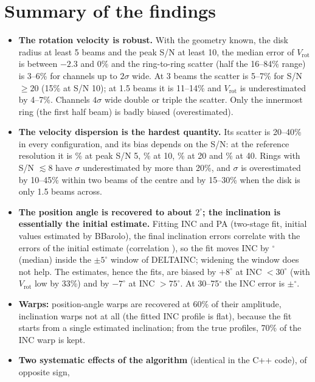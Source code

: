 \documentclass[10pt,a4paper]{article}
\newcommand{\vrot}{V_\mathrm{rot}}
\begin{document}
\section*{Summary of the findings}
\begin{itemize}
\item \textbf{The rotation velocity is robust.} With the geometry known, the disk radius at least 5
  beams and the peak S/N at least 10, the median error of $\vrot$ is between $-2.3$ and $0$\% and the
  ring-to-ring scatter (half the 16--84\% range) is 3--6\% for channels up to $2\sigma$ wide. At 3 beams
  the scatter is 5--7\% for S/N $\geq 20$ (15\% at S/N 10); at 1.5 beams it is 11--14\% and $\vrot$ is
  underestimated by 4--7\%. Channels $4\sigma$ wide double or triple the scatter. Only the innermost ring
  (the first half beam) is badly biased (overestimated).
\item \textbf{The velocity dispersion is the hardest quantity.} Its scatter is 20--40\% in every
  configuration, and its bias depends on the S/N: at the reference resolution it is
  \MaskSearchFiveS\% at peak S/N 5, \MaskSearchTenS\% at 10, \MaskSearchTwentyS\% at 20 and
  \MaskSearchFortyS\% at 40. Rings with S/N $\lesssim 8$ have $\sigma$ underestimated by more than 20\%,
  and $\sigma$ is overestimated by 10--45\% within two beams of the centre and by 15--30\% when the
  disk is only 1.5 beams across.
\item \textbf{The position angle is recovered to about $2^\circ$; the inclination is essentially the
  initial estimate.} Fitting INC and PA (two-stage fit, initial values estimated by BBarolo), the
  final inclination errors correlate with the errors of the initial estimate (correlation
  \GeoDefCorr), so the fit moves INC by \GeoDefMove$^\circ$ (median) inside the $\pm5^\circ$ window
  of DELTAINC; widening the window does not help. The estimates, hence the fits, are biased by
  $+8^\circ$ at INC $<30^\circ$ (with $\vrot$ low by 33\%) and by $-7^\circ$ at INC $>75^\circ$. At
  30--75$^\circ$ the INC error is \GeoDefIncMed$\pm$\GeoDefIncSig$^\circ$.
\item \textbf{Warps:} position-angle warps are recovered at 60\% of their amplitude, inclination
  warps not at all (the fitted INC profile is flat), because the fit starts from a single estimated
  inclination; from the true profiles, 70\% of the INC warp is kept.
\item \textbf{Two systematic effects of the algorithm} (identical in the C++ code), of opposite sign,

\end{itemize}
\end{document}
